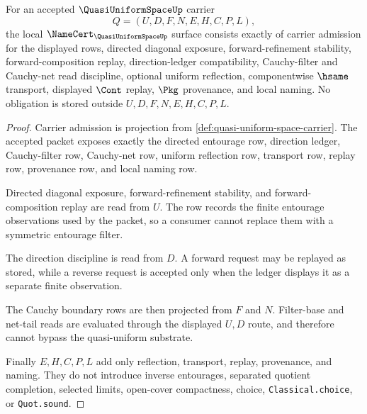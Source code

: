 \begin{theorem}
\label{thm:quasi-uniform-space-entourage-obligations}
For an accepted $\QuasiUniformSpaceUp$ carrier
$$
Q=(U,D,F,N,E,H,C,P,L),
$$
the local $\NameCert_{\QuasiUniformSpaceUp}$ surface consists exactly of carrier admission for the displayed rows, directed diagonal exposure, forward-refinement stability, forward-composition replay, direction-ledger compatibility, Cauchy-filter and Cauchy-net read discipline, optional uniform reflection, componentwise $\hsame$ transport, displayed $\Cont$ replay, $\Pkg$ provenance, and local naming. No obligation is stored outside $U,D,F,N,E,H,C,P,L$.
\end{theorem}
\begin{proof}
Carrier admission is projection from \autoref{def:quasi-uniform-space-carrier}. The accepted packet exposes exactly the directed entourage row, direction ledger, Cauchy-filter row, Cauchy-net row, uniform reflection row, transport row, replay row, provenance row, and local naming row.

Directed diagonal exposure, forward-refinement stability, and forward-composition replay are read from $U$. The row records the finite entourage observations used by the packet, so a consumer cannot replace them with a symmetric entourage filter.

The direction discipline is read from $D$. A forward request may be replayed as stored, while a reverse request is accepted only when the ledger displays it as a separate finite observation.

The Cauchy boundary rows are then projected from $F$ and $N$. Filter-base and net-tail reads are evaluated through the displayed $U,D$ route, and therefore cannot bypass the quasi-uniform substrate.

Finally $E,H,C,P,L$ add only reflection, transport, replay, provenance, and naming. They do not introduce inverse entourages, separated quotient completion, selected limits, open-cover compactness, choice, \texttt{Classical.choice}, or \texttt{Quot.sound}.
\end{proof}


